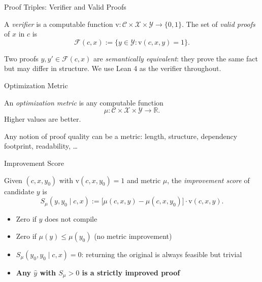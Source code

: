 \documentclass{beamer}
\newcommand{\good}[1]{\textcolor{improverGreen}{\textbf{#1}}}
\begin{document}
\begin{frame}{Proof Triples: Verifier and Valid Proofs}
\vspace{0.4em}
\begin{definition}
A \emph{verifier} is a computable function $\mathrm{v} : \mathcal{C} \times \mathcal{X} \times \mathcal{Y} \to \{0,1\}$. The set of \emph{valid proofs} of $x$ in $c$ is
\[
  \mathcal{F}(c,x) := \{y \in \mathcal{Y} : \mathrm{v}(c,x,y) = 1\}.
\]
\end{definition}
\vspace{0.5em}
\small Two proofs $y, y' \in \mathcal{F}(c,x)$ are \emph{semantically equivalent}: they prove the same fact but may differ in structure. We use Lean 4 as the verifier throughout.
\end{frame}

\begin{frame}{Optimization Metric}
\vspace{0.5em}
\begin{definition}
An \emph{optimization metric} is any computable function
\[\mu : \mathcal{C} \times \mathcal{X} \times \mathcal{Y} \to \mathbb{R}.\]
Higher values are better.
\end{definition}
\vspace{0.6em}
Any notion of proof quality can be a metric: length, structure, dependency footprint, readability, \ldots
\end{frame}

\begin{frame}{Improvement Score}
\vspace{0.4em}
\begin{definition}
Given $(c, x, y_0)$ with $\mathrm{v}(c,x,y_0)=1$ and metric $\mu$, the \emph{improvement score} of candidate $y$ is
\[
  S_\mu(y, y_0 \mid c, x) := \bigl[\mu(c,x,y) - \mu(c,x,y_0)\bigr] \cdot \mathrm{v}(c,x,y).
\]
\end{definition}
\vspace{0.5em}
\begin{itemize}\setlength{\itemsep}{8pt}
  \item Zero if $y$ does not compile
  \item Zero if $\mu(y) \le \mu(y_0)$ (no metric improvement)
  \item $S_\mu(y_0, y_0 \mid c,x) = 0$: returning the original is always feasible but trivial
  \item \good{Any $\hat{y}$ with $S_\mu > 0$ is a strictly improved proof}
\end{itemize}
\end{frame}
\end{document}
